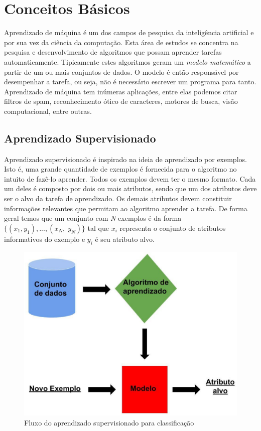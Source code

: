 \chapter{Conceitos Básicos}
\label{chap:conceitosbasicos}

Aprendizado de máquina é um dos campos de pesquisa da inteligência artificial e por sua vez da ciência da computação.
Esta área de estudos se concentra na pesquisa e desenvolvimento de algoritmos que possam aprender tarefas automaticamente.
Tipicamente estes algoritmos geram um \textit{modelo matemático} a partir de um ou mais conjuntos de dados.
O modelo é então responsável por desempenhar a tarefa, ou seja, não é necessário escrever um programa para tanto.
Aprendizado de máquina tem inúmeras aplicações, entre elas podemos citar filtros de spam, reconhecimento ótico de caracteres, motores de busca, visão computacional, entre outras.

\section{Aprendizado Supervisionado}

Aprendizado supervisionado é inspirado na ideia de aprendizado por exemplos.
Isto é, uma grande quantidade de exemplos é fornecida para o algoritmo no intuito de fazê-lo aprender.
Todos os exemplos devem ter o mesmo formato.
Cada um deles é composto por dois ou mais atributos, sendo que um dos atributos deve ser o alvo da tarefa de aprendizado.
Os demais atributos devem constituir informações relevantes que permitam ao algoritmo aprender a tarefa.
De forma geral temos que um conjunto com \textit{N} exemplos é da forma $ \{(x_1, y_1), ..., (x_N,\; y_N)\} $ tal que $x_i$ representa o conjunto de atributos informativos do exemplo e $y_i$ é seu atributo alvo.

\begin{figure}[h!]
  \includegraphics[width=\linewidth]{images/conceitosbasicos01.eps}
  \caption{Fluxo do aprendizado supervisionado para classificação}
  \label{fig:conceitosbasicos01}
\end{figure}

